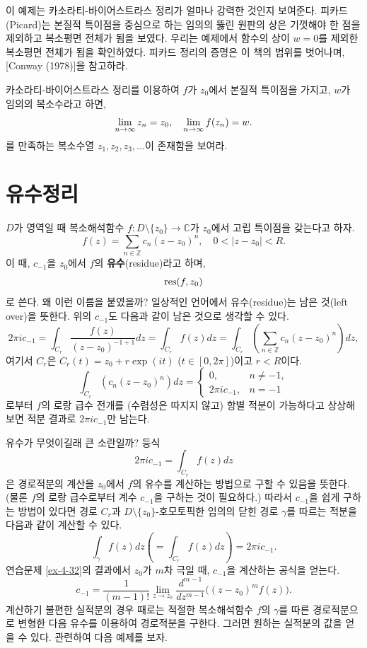 이 예제는 카소라티-바이어스트라스 정리가 얼마나 강력한 것인지 보여준다.
피카드(Picard)는 본질적 특이점을 중심으로 하는 임의의 뚫린 원판의 상은
기껏해야 한 점을 제외하고 복소평면 전체가 됨을 보였다.
우리는 예제에서 함수의 상이 $w=0$를 제외한 복소평면 전체가 됨을 확인하였다.
피카드 정리의 증명은 이 책의 범위를 벗어나며, [Conway (1978)]을 참고하라.

\begin{salt_exercise}\label{ex-4-39}
카소라티-바이어스트라스 정리를 이용하여
$f$가 $z_0$에서 본질적 특이점을 가지고,
$w$가 임의의 복소수라고 하면,
\[
\lim\limits_{n\to \infty} z_n = z_0,
\quad
\lim\limits_{n\to\infty} f(z_n) = w.
\]
를 만족하는 복소수열 $z_1, z_2, z_3, \ldots$이 존재함을 보여라.
\end{salt_exercise}

\section{유수정리}

$D$가 영역일 때
복소해석함수 $f:D\setminus \{z_0\}\to \mathbb C$가
$z_0$에서 고립 특이점을 갖는다고 하자.
\[
f(z) = \sum_{n\in\mathbb Z} c_n (z-z_0)^n,\quad
0<|z-z_0|<R.
\]
이 때, $c_{-1}$을 $z_0$에서 $f$의 {\bf 유수}(residue)라고 하며,
\[
\mathop{\mathrm{res}}(f,z_0)
\]
로 쓴다.
왜 이런 이름을 붙였을까?
일상적인 언어에서 유수(residue)는 남은 것(left over)을 뜻한다.
위의 $c_{-1}$도 다음과 같이 남은 것으로 생각할 수 있다.
\[
2\pi i c_{-1} = \int_{C_r} \dfrac{f(z)}{(z-z_0)^{-1+1}}dz
= \int_{C_r} f(z)dz 
= \int_{C_r} \left( \sum_{n\in\mathbb Z}c_n(z-z_0)^n\right) dz,
\]
여기서 $C_r$은 $C_r(t) = z_0 + r\exp(it)$ ($t\in[0,2\pi]$)이고
$r<R$이다.
\[
\int_{C_r} \left( c_n(z-z_0)^n \right) dz = 
\begin{cases}
0, & n\ne -1, \\
2\pi i c_{-1}, & n= -1
\end{cases}
\]
로부터 $f$의 로랑 급수 전개를 (수렴성은 따지지 않고) 항별 적분이 가능하다고 
상상해보면 적분 결과로 $2\pi i c_{-1}$만 남는다.

유수가 무엇이길래 큰 소란일까? 등식
\[
2\pi i c_{-1}= \int_{C_r} f(z)dz 
\]
은 경로적분의 계산을 $z_0$에서 $f$의 유수를 계산하는 방법으로 구할 수 있음을 뜻한다.
(물론 $f$의 로랑 급수로부터 계수 $c_{-1}$을 구하는 것이 필요하다.)
따라서 $c_{-1}$을 쉽게 구하는 방법이 있다면
경로 $C_r$과 $D\setminus\{z_0\}$-호모토픽한 임의의 닫힌 경로 $\gamma$를 따르는 적분을
다음과 같이 계산할 수 있다.
\begin{equation} \label{eq-4-7}
\int_\gamma f(z)dz \left( = \int_{C_r} f(z)dz \right) = 2\pi i c_{-1}.
\end{equation}
연습문제 \ref{ex-4-32}의 결과에서 
$z_0$가 $m$차 극일 때,
$c_{-1}$을 계산하는 공식을 얻는다.
\[
c_{-1} = \dfrac1{(m-1)!}\lim_{z\to z_0} \dfrac{d^{m-1}}{dz^{m-1}}
\Big( (z-z_0)^m f(z) \Big).
\]
계산하기 불편한 실적분의 경우 때로는
적절한 복소해석함수 $f$의 $\gamma$를 따른 경로적분으로 변형한 다음
유수를 이용하여 경로적분을 구한다.
그러면 원하는 실적분의 값을 얻을 수 있다.
관련하여 다음 예제를 보자.


